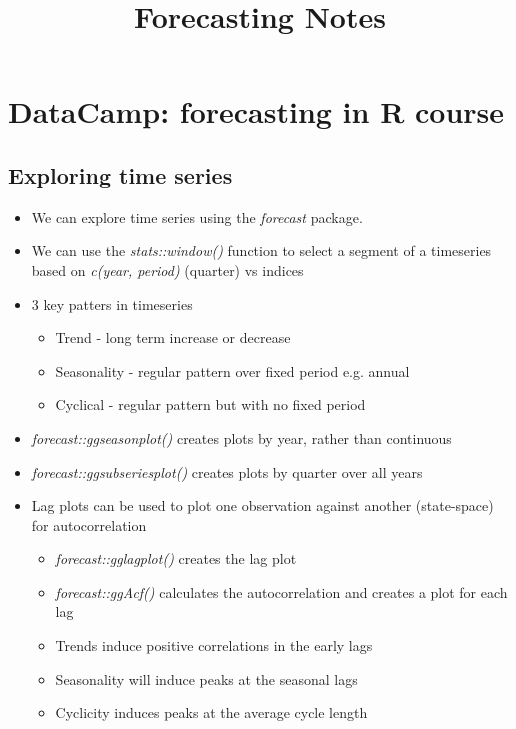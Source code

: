 \documentclass{article}\usepackage[]{graphicx}\usepackage[]{color}
\title{Forecasting Notes}
\begin{document}
\maketitle

\section{DataCamp: forecasting in R course}

\subsection{Exploring time series}

\begin{itemize}
	\item We can explore time series using the \textit{forecast} package.
	\item We can use the \textit{stats::window()} function to select a segment of a timeseries based on \textit{c(year, period)} (quarter) vs indices
	\item 3 key patters in timeseries
	\begin{itemize}
        \item Trend - long term increase or decrease
        \item Seasonality - regular pattern over fixed period e.g. annual
        \item Cyclical - regular pattern but with no fixed period
    \end{itemize}
    \item \textit{forecast::ggseasonplot()} creates plots by year, rather than continuous
    \item \textit{forecast::ggsubseriesplot()} creates plots by quarter over all years
    \item Lag plots can be used to plot one observation against another (state-space) for autocorrelation
    \begin{itemize}
        \item \textit{forecast::gglagplot()} creates the lag plot
        \item \textit{forecast::ggAcf()} calculates the autocorrelation and creates a plot for each lag
        \item Trends induce positive correlations in the early lags
        \item Seasonality will induce peaks at the seasonal lags
        \item Cyclicity induces peaks at the average cycle length
    \end{itemize}

\end{itemize}
\end{document}
